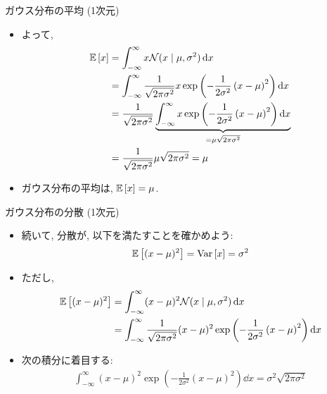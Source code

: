 \documentclass[dvipdfmx,notheorems,t]{beamer}
\begin{document}
\begin{frame}{ガウス分布の平均 (1次元)}
\begin{itemize}
  \item よって,
  \begin{align*}
    \operatorname{\mathbb{E}} \left[ x \right] &= \int_{-\infty}^\infty x \mathcal{N}(x \mid \mu, \sigma^2) \dd{x} \\
      &= \int_{-\infty}^\infty \frac{1}{\sqrt{2 \pi \sigma^2}} x
        \exp \left( -\frac{1}{2 \sigma^2} \left( x - \mu \right)^2 \right) \dd{x} \\
      &= \frac{1}{\sqrt{2 \pi \sigma^2}} \underbrace{\int_{-\infty}^\infty x
        \exp \left( -\frac{1}{2 \sigma^2} \left( x - \mu \right)^2 \right) \dd{x}}_{= \mu \sqrt{2 \pi \sigma^2}} \\
      &= \frac{1}{\sqrt{2 \pi \sigma^2}} \mu \sqrt{2 \pi \sigma^2}
      = \mu
  \end{align*}
  \item ガウス分布の平均は, $\operatorname{\mathbb{E}} \left[ x \right] = \mu$.
\end{itemize}
\end{frame}

\begin{frame}{ガウス分布の分散 (1次元)}
\begin{itemize}
  \item 続いて, 分散が, 以下を満たすことを確かめよう:
  \begin{align*}
    \operatorname{\mathbb{E}} \left[ (x - \mu)^2 \right] = \operatorname{Var} \left[ x \right] = \sigma^2
  \end{align*}
  \item ただし,
  \begin{align*}
    \operatorname{\mathbb{E}} \left[ (x - \mu)^2 \right] &= \int_{-\infty}^\infty (x - \mu)^2 \mathcal{N}(x \mid \mu, \sigma^2) \dd{x} \\
      &= \int_{-\infty}^\infty \frac{1}{\sqrt{2 \pi \sigma^2}} (x - \mu)^2
        \exp \left( -\frac{1}{2 \sigma^2} \left( x - \mu \right)^2 \right) \dd{x}
  \end{align*}
  \item 次の積分に着目する:
  \begin{align*}
    \int_{-\infty}^\infty (x - \mu)^2
      \exp \left( -\frac{1}{2 \sigma^2} \left( x - \mu \right)^2 \right) \dd{x}
      = \sigma^2 \sqrt{2 \pi \sigma^2}
  \end{align*}
\end{itemize}
\end{frame}
\end{document}

